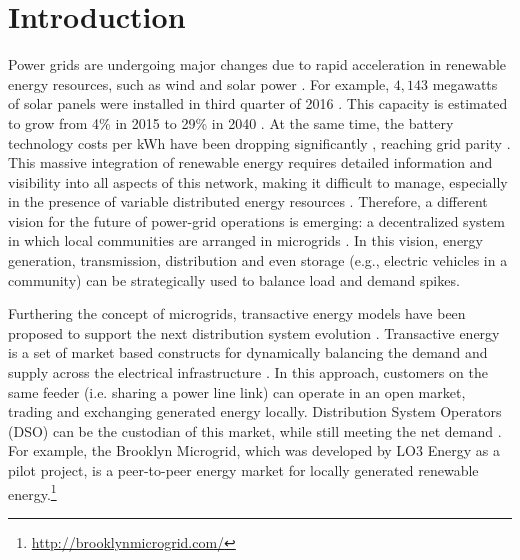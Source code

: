 \section{Introduction}


Power grids are undergoing major changes due to rapid
acceleration in renewable energy resources, such as wind and solar power \cite{EIA2014, 5430489}. For example, 
$4,143$ megawatts of solar panels were installed in third quarter of 2016 \cite{seia}. This capacity is estimated to grow from 4\% in 2015 to 29\% in 2040 \cite{Randal}. At the same time, the battery technology costs per kWh have been dropping significantly \cite{stock2015powerful}, reaching grid parity \cite{bronski2015economics}. This massive integration of renewable energy requires detailed information and visibility into all aspects of this network, making it difficult to manage, especially in the presence of variable distributed energy resources \cite{7452738}. Therefore, a different vision for the future of power-grid operations is emerging: a decentralized system in which local communities are arranged in microgrids \cite{rahimi2012transactive}. In this vision, energy generation, transmission, distribution and even storage (e.g., electric vehicles in a community) can be strategically used to balance load and demand spikes. 


Furthering the concept of microgrids, transactive energy models have been proposed to support the next distribution system evolution \cite{kok2016society,cox2013structured,melton2013gridwise}. Transactive energy is a set of market based constructs for dynamically balancing the demand and supply across the electrical infrastructure \cite{melton2013gridwise}. In this approach, customers on the same feeder (i.e. sharing a power line link) can operate in an open market, trading and exchanging generated energy locally. Distribution System Operators (DSO) can be the custodian of this market, while still meeting the net demand \cite{7462854}. For example, the Brooklyn Microgrid, which was developed by LO3 Energy as a pilot project, is a peer-to-peer energy market for locally generated renewable energy.\footnote{\url{http://brooklynmicrogrid.com/}}

